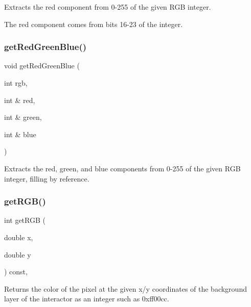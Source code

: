 Extracts the red component from 0-\/255 of the given R\+GB integer. 

The red component comes from bits 16-\/23 of the integer. \mbox{\label{classsgl_1_1GCanvas_ab13dd3d16d2b7bd90fbf9595df9cf2b7}} 
\subsubsection{\texorpdfstring{get\+Red\+Green\+Blue()}{getRedGreenBlue()}}
{\footnotesize\ttfamily void get\+Red\+Green\+Blue (\begin{DoxyParamCaption}\item[{int}]{rgb,  }\item[{int \&}]{red,  }\item[{int \&}]{green,  }\item[{int \&}]{blue }\end{DoxyParamCaption})\hspace{0.3cm}{\ttfamily [static]}}



Extracts the red, green, and blue components from 0-\/255 of the given R\+GB integer, filling by reference. 

\mbox{\label{classsgl_1_1GDrawingSurface_a9e983467cf0c97cfd62433a8471570dc}} 
\subsubsection{\texorpdfstring{get\+R\+G\+B()}{getRGB()}}
{\footnotesize\ttfamily int get\+R\+GB (\begin{DoxyParamCaption}\item[{double}]{x,  }\item[{double}]{y }\end{DoxyParamCaption}) const\hspace{0.3cm}{\ttfamily [virtual]}, {\ttfamily [inherited]}}



Returns the color of the pixel at the given x/y coordinates of the background layer of the interactor as an integer such as 0xff00cc. 

